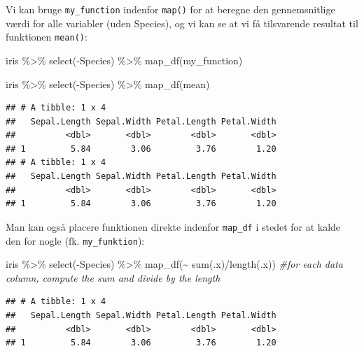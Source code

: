 \documentclass[
]{book}
\newenvironment{Shaded}{\begin{snugshade}}{\end{snugshade}}
\newcommand{\CommentTok}[1]{\textcolor[rgb]{0.56,0.35,0.01}{\textit{#1}}}
\newcommand{\FunctionTok}[1]{\textcolor[rgb]{0.00,0.00,0.00}{#1}}
\newcommand{\NormalTok}[1]{#1}
\newcommand{\SpecialCharTok}[1]{\textcolor[rgb]{0.00,0.00,0.00}{#1}}
\begin{document}
Vi kan bruge \texttt{my\_function} indenfor \texttt{map()} for at beregne den gennemsnitlige værdi for alle variabler (uden Species), og vi kan se at vi få tilsvarende resultat til funktionen \texttt{mean()}:

\begin{Shaded}
\begin{Highlighting}[]
\NormalTok{iris }\SpecialCharTok{\%\textgreater{}\%} 
  \FunctionTok{select}\NormalTok{(}\SpecialCharTok{{-}}\NormalTok{Species) }\SpecialCharTok{\%\textgreater{}\%} 
  \FunctionTok{map\_df}\NormalTok{(my\_function)}

\NormalTok{iris }\SpecialCharTok{\%\textgreater{}\%} 
  \FunctionTok{select}\NormalTok{(}\SpecialCharTok{{-}}\NormalTok{Species) }\SpecialCharTok{\%\textgreater{}\%} 
  \FunctionTok{map\_df}\NormalTok{(mean)}
\end{Highlighting}
\end{Shaded}

\begin{verbatim}
## # A tibble: 1 x 4
##   Sepal.Length Sepal.Width Petal.Length Petal.Width
##          <dbl>       <dbl>        <dbl>       <dbl>
## 1         5.84        3.06         3.76        1.20
## # A tibble: 1 x 4
##   Sepal.Length Sepal.Width Petal.Length Petal.Width
##          <dbl>       <dbl>        <dbl>       <dbl>
## 1         5.84        3.06         3.76        1.20
\end{verbatim}

Man kan også placere funktionen direkte indenfor \texttt{map\_df} i stedet for at kalde den for nogle (fk. \texttt{my\_funktion}):

\begin{Shaded}
\begin{Highlighting}[]
\NormalTok{iris }\SpecialCharTok{\%\textgreater{}\%}
  \FunctionTok{select}\NormalTok{(}\SpecialCharTok{{-}}\NormalTok{Species) }\SpecialCharTok{\%\textgreater{}\%}
  \FunctionTok{map\_df}\NormalTok{(}\SpecialCharTok{\textasciitilde{}} \FunctionTok{sum}\NormalTok{(.x)}\SpecialCharTok{/}\FunctionTok{length}\NormalTok{(.x)) }\CommentTok{\#for each data column, compute the sum and divide by the length}
\end{Highlighting}
\end{Shaded}

\begin{verbatim}
## # A tibble: 1 x 4
##   Sepal.Length Sepal.Width Petal.Length Petal.Width
##          <dbl>       <dbl>        <dbl>       <dbl>
## 1         5.84        3.06         3.76        1.20
\end{verbatim}
\end{document}

